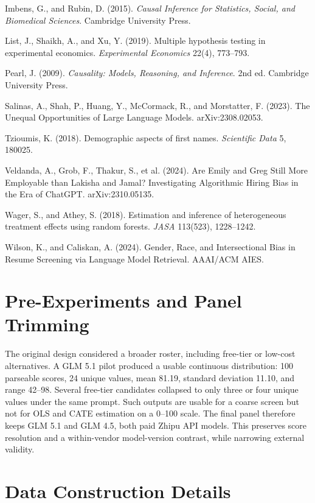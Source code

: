 \documentclass[10pt,twocolumn,letterpaper]{article}
\begin{document}
Imbens, G., and Rubin, D. (2015). \emph{Causal Inference for Statistics, Social, and Biomedical Sciences}. Cambridge University Press.

List, J., Shaikh, A., and Xu, Y. (2019). Multiple hypothesis testing in experimental economics. \emph{Experimental Economics} 22(4), 773--793.

Pearl, J. (2009). \emph{Causality: Models, Reasoning, and Inference}. 2nd ed. Cambridge University Press.

Salinas, A., Shah, P., Huang, Y., McCormack, R., and Morstatter, F. (2023). The Unequal Opportunities of Large Language Models. arXiv:2308.02053.

Tzioumis, K. (2018). Demographic aspects of first names. \emph{Scientific Data} 5, 180025.

Veldanda, A., Grob, F., Thakur, S., et al. (2024). Are Emily and Greg Still More Employable than Lakisha and Jamal? Investigating Algorithmic Hiring Bias in the Era of ChatGPT. arXiv:2310.05135.

Wager, S., and Athey, S. (2018). Estimation and inference of heterogeneous treatment effects using random forests. \emph{JASA} 113(523), 1228--1242.

Wilson, K., and Caliskan, A. (2024). Gender, Race, and Intersectional Bias in Resume Screening via Language Model Retrieval. AAAI/ACM AIES.

\appendix
\section{Pre-Experiments and Panel Trimming}
\label{app:preexp}

The original design considered a broader roster, including free-tier or low-cost alternatives. A GLM 5.1 pilot produced a usable continuous distribution: 100 parseable scores, 24 unique values, mean 81.19, standard deviation 11.10, and range 42--98. Several free-tier candidates collapsed to only three or four unique values under the same prompt. Such outputs are usable for a coarse screen but not for OLS and CATE estimation on a 0--100 scale. The final panel therefore keeps GLM 5.1 and GLM 4.5, both paid Zhipu API models. This preserves score resolution and a within-vendor model-version contrast, while narrowing external validity.

\section{Data Construction Details}
\label{app:data}
\end{document}
